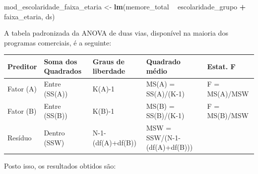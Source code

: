 \documentclass[
]{book}
\newenvironment{Shaded}{\begin{snugshade}}{\end{snugshade}}
\newcommand{\KeywordTok}[1]{\textcolor[rgb]{0.13,0.29,0.53}{\textbf{#1}}}
\newcommand{\NormalTok}[1]{#1}
\newcommand{\OperatorTok}[1]{\textcolor[rgb]{0.81,0.36,0.00}{\textbf{#1}}}
\newcommand{\StringTok}[1]{\textcolor[rgb]{0.31,0.60,0.02}{#1}}
\begin{document}
\begin{Shaded}
\begin{Highlighting}[]
\NormalTok{mod_escolaridade_faixa_etaria <-}\StringTok{ }\KeywordTok{lm}\NormalTok{(memore_total }\OperatorTok{~}\StringTok{ }\NormalTok{escolaridade_grupo }\OperatorTok{+}\StringTok{ }\NormalTok{faixa_etaria, ds)}
\end{Highlighting}
\end{Shaded}

A tabela padronizada da ANOVA de duas vias, disponível na maioria dos
programas comerciais, é a seguinte:

\begin{longtable}[]{@{}lllll@{}}
\toprule
Preditor & Soma dos Quadrados & Graus de liberdade & Quadrado médio &
Estat. F\tabularnewline
\midrule
\endhead
Fator (A) & Entre (SS(A)) & K(A)-1 & MS(A) = SS(A)/(K-1) & F =
MS(A)/MSW\tabularnewline
Fator (B) & Entre (SS(B)) & K(B)-1 & MS(B) = SS(B)/(K-1) & F =
MS(B)/MSW\tabularnewline
Resíduo & Dentro (SSW) & N-1-(df(A)+df(B)) & MSW =
SSW/(N-1-(df(A)+df(B))) &\tabularnewline
\bottomrule
\end{longtable}

Posto isso, os resultados obtidos são:

\begin{Shaded}
\end{Shaded}
\end{document}
